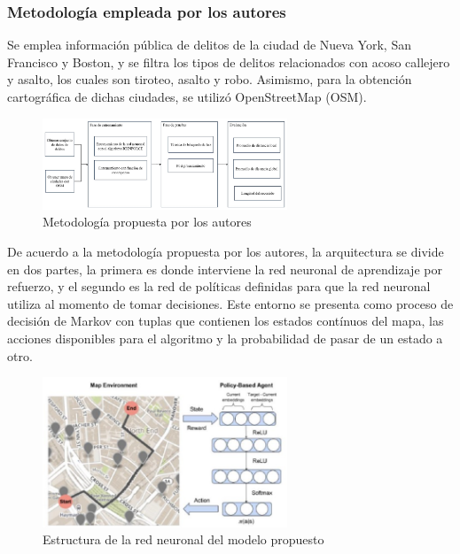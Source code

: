 \subsubsection{Metodología empleada por los autores}
Se emplea información pública de delitos de la ciudad de Nueva York, San Francisco y Boston, y se filtra los tipos de delitos relacionados con acoso callejero y asalto, los cuales son tiroteo, asalto y robo. Asimismo, para la obtención cartográfica de dichas ciudades, se utilizó OpenStreetMap (OSM).

\begin{figure}[h]
	\begin{center}
		\includegraphics[width=0.65\textwidth]{2/figures/SafeMetodo.jpg}
		\caption{Metodología propuesta por los autores}
		\label{1:fig2}
	\end{center}
\end{figure}

De acuerdo a la metodología propuesta por los autores, la arquitectura se divide en dos partes, la primera es donde interviene la red neuronal de aprendizaje por refuerzo, y el segundo es la red de políticas definidas para que la red neuronal utiliza al momento de tomar decisiones. Este entorno se presenta como proceso de decisión de Markov con tuplas que contienen los estados contínuos del mapa, las acciones disponibles para el algoritmo y la probabilidad de pasar de un estado a otro.

\begin{figure}[h]
	\begin{center}
		\includegraphics[width=0.65\textwidth]{2/figures/safeRouteAgent.jpg}
		\caption{Estructura de la red neuronal del modelo propuesto}
		\label{1:fig2}
	\end{center}
\end{figure}

